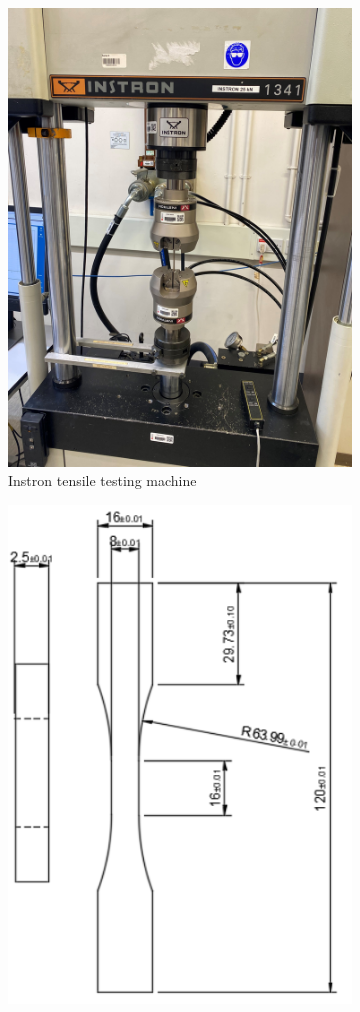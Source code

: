 \documentclass[11pt,a4paper]{article}
\begin{document}
\begin{figure} [ht]
\begin{subfigure}{0.5\textwidth}
\includegraphics[scale=0.05, angle=270, center]{Instron_full.png}
\caption{Instron tensile testing machine}
\label{machine}
\end{subfigure}
\begin{subfigure}{0.5\textwidth}
\includegraphics[scale=0.61, angle=0, center]{dogbone_specimen.png}

\end{subfigure}
\end{figure}
\end{document}
